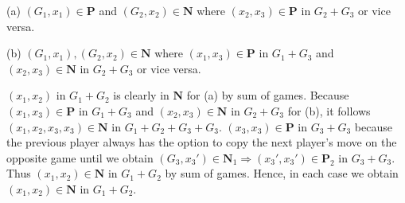 \documentclass[10pt]{article}
\begin{document}
\begin{itemize}
(a) $(G_1,x_1)\in\mathbf{P}$ and $(G_2,x_2)\in\mathbf{N}$ where $(x_2,x_3)\in\mathbf{P}$ in $G_2+G_3$ or vice versa.\par
(b) $(G_1,x_1),(G_2,x_2)\in\mathbf{N}$ where $(x_1,x_3)\in\mathbf{P}$ in $G_1+G_3$ and $(x_2,x_3)\in\mathbf{N}$ in $G_2+G_3$ or vice versa.\par 
$(x_1,x_2)$ in $G_1+G_2$ is clearly in $\mathbf{N}$ for (a) by sum of games. Because $(x_1,x_3)\in\mathbf{P}$ in $G_1+G_3$ and $(x_2,x_3)\in\mathbf{N}$ in $G_2+G_3$ for (b), it follows $(x_1,x_2,x_3,x_3)\in\mathbf{N}$ in $G_1+G_2+G_3+G_3$. $(x_3,x_3)\in\mathbf{P}$ in $G_3+G_3$ because the previous player always has the option to copy the next player's move on the opposite game until we obtain $(G_3,x_3')\in\mathbf{N}_1\Rightarrow(x_3',x_3')\in\mathbf{P}_2$ in $G_3+G_3$. Thus $(x_1,x_2)\in\mathbf{N}$ in $G_1+G_2$ by sum of games.
Hence, in each case we obtain $(x_1,x_2)\in\mathbf{N}$ in $G_1+G_2$.\\


\end{itemize}
\end{document}
